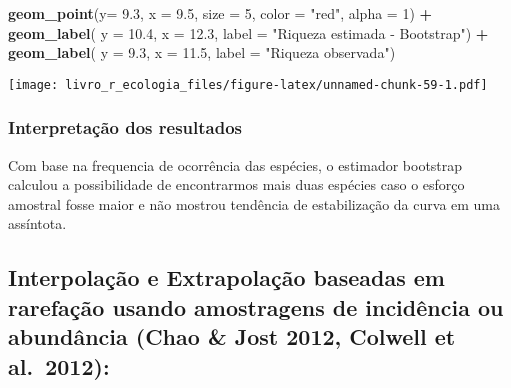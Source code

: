 \documentclass[
]{book}
\newenvironment{Shaded}{\begin{snugshade}}{\end{snugshade}}
\newcommand{\DataTypeTok}[1]{\textcolor[rgb]{0.13,0.29,0.53}{#1}}
\newcommand{\DecValTok}[1]{\textcolor[rgb]{0.00,0.00,0.81}{#1}}
\newcommand{\FloatTok}[1]{\textcolor[rgb]{0.00,0.00,0.81}{#1}}
\newcommand{\KeywordTok}[1]{\textcolor[rgb]{0.13,0.29,0.53}{\textbf{#1}}}
\newcommand{\NormalTok}[1]{#1}
\newcommand{\OperatorTok}[1]{\textcolor[rgb]{0.81,0.36,0.00}{\textbf{#1}}}
\newcommand{\StringTok}[1]{\textcolor[rgb]{0.31,0.60,0.02}{#1}}
\begin{document}
\begin{Shaded}
\begin{Highlighting}[]
\StringTok{  }\KeywordTok{geom_point}\NormalTok{(}\DataTypeTok{y=} \FloatTok{9.3}\NormalTok{, }\DataTypeTok{x =} \FloatTok{9.5}\NormalTok{, }\DataTypeTok{size =} \DecValTok{5}\NormalTok{, }\DataTypeTok{color =} \StringTok{"red"}\NormalTok{, }\DataTypeTok{alpha =} \DecValTok{1}\NormalTok{) }\OperatorTok{+}\StringTok{ }
\StringTok{  }\KeywordTok{geom_label}\NormalTok{( }\DataTypeTok{y =} \FloatTok{10.4}\NormalTok{, }\DataTypeTok{x =} \FloatTok{12.3}\NormalTok{, }\DataTypeTok{label =} \StringTok{"Riqueza estimada - Bootstrap"}\NormalTok{) }\OperatorTok{+}
\StringTok{  }\KeywordTok{geom_label}\NormalTok{( }\DataTypeTok{y =} \FloatTok{9.3}\NormalTok{, }\DataTypeTok{x =} \FloatTok{11.5}\NormalTok{, }\DataTypeTok{label =} \StringTok{"Riqueza observada"}\NormalTok{)}
\end{Highlighting}
\end{Shaded}

\texttt{[image: livro\_r\_ecologia\_files/figure-latex/unnamed-chunk-59-1.pdf]}

\hypertarget{interpretauxe7uxe3o-dos-resultados-5}{%
\subsubsection{Interpretação dos resultados}\label{interpretauxe7uxe3o-dos-resultados-5}}

Com base na frequencia de ocorrência das espécies, o estimador bootstrap calculou a possibilidade de encontrarmos mais duas espécies caso o esforço amostral fosse maior e não mostrou tendência de estabilização da curva em uma assíntota.

\hypertarget{interpolauxe7uxe3o-e-extrapolauxe7uxe3o-baseadas-em-rarefauxe7uxe3o-usando-amostragens-de-inciduxeancia-ou-abunduxe2ncia-chao-jost-2012-colwell-et-al.-2012}{%
\subsection{Interpolação e Extrapolação baseadas em rarefação usando amostragens de incidência ou abundância (Chao \& Jost 2012, Colwell et al.~2012):}\label{interpolauxe7uxe3o-e-extrapolauxe7uxe3o-baseadas-em-rarefauxe7uxe3o-usando-amostragens-de-inciduxeancia-ou-abunduxe2ncia-chao-jost-2012-colwell-et-al.-2012}}
\end{document}
